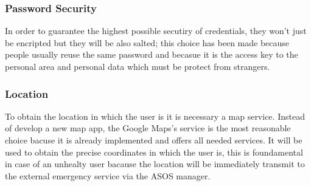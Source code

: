 \subsubsection{Password Security}
In order to guarantee the highest possible secutiry of credentials, they won't just be encripted but they will be also salted; this choice has been made because people usually reuse the same password and becasue it is the access key to the personal area and personal data which must be protect from strangers.

\subsubsection{Location}
To obtain the location in which the user is it is necessary a map service. Instead of develop a new map app, the Google Maps's service is the most reasonable choice bacuse it is already implemented and offers all needed services. It will be used to obtain the precise coordinates in which the user is, this is foundamental in case of an unhealty user bacause the location will be immediately transmit to the external emergency service via the ASOS manager.